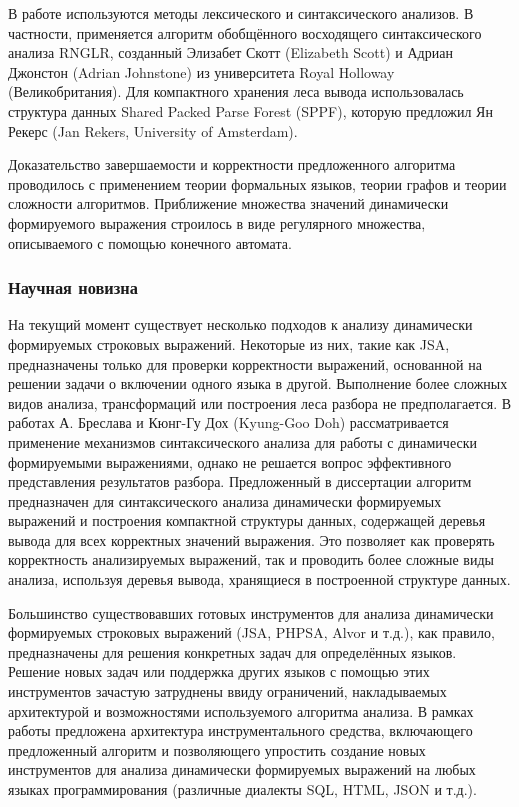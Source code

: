 В работе используются методы лексического и синтаксического анализов. В частности, применяется алгоритм обобщённого восходящего синтаксического анализа RNGLR, созданный Элизабет Скотт (Elizabeth Scott) и Адриан Джонстон (Adrian Johnstone) из университета Royal Holloway (Великобритания). Для компактного хранения леса вывода использовалась структура данных Shared Packed Parse Forest (SPPF), которую предложил Ян Рекерс (Jan Rekers, University of Amsterdam).

Доказательство завершаемости и корректности предложенного алгоритма проводилось с применением теории формальных языков, теории графов и теории сложности алгоритмов. Приближение множества значений динамически формируемого выражения строилось в виде регулярного множества, описываемого с помощью конечного автомата.

\subsubsection*{\large{Научная новизна}}

На текущий момент существует несколько подходов к анализу динамически формируемых строковых выражений. Некоторые из них, такие как JSA, предназначены только для проверки корректности выражений, основанной на решении задачи о включении одного языка в другой. Выполнение более сложных видов анализа, трансформаций или построения леса разбора не предполагается. В работах А. Бреслава и Кюнг-Гу Дох (Kyung-Goo Doh) рассматривается применение механизмов синтаксического анализа для работы с динамически формируемыми выражениями, однако не решается вопрос эффективного представления результатов разбора. Предложенный в диссертации алгоритм предназначен для синтаксического анализа динамически формируемых выражений и построения компактной структуры данных, содержащей деревья вывода для всех корректных значений выражения. Это позволяет как проверять корректность анализируемых выражений, так и проводить более сложные виды анализа, используя деревья вывода, хранящиеся в построенной структуре данных.

Большинство существовавших готовых инструментов для анализа динамически формируемых строковых выражений (JSA, PHPSA, Alvor и т.д.), как правило, предназначены для решения конкретных задач для определённых языков. Решение новых задач или поддержка других языков с помощью этих инструментов зачастую затруднены ввиду ограничений, накладываемых архитектурой и возможностями используемого алгоритма анализа. В рамках работы предложена архитектура инструментального средства, включающего предложенный алгоритм и позволяющего упростить создание новых инструментов для анализа динамически формируемых выражений на любых языках программирования (различные диалекты SQL, HTML, JSON и т.д.).

